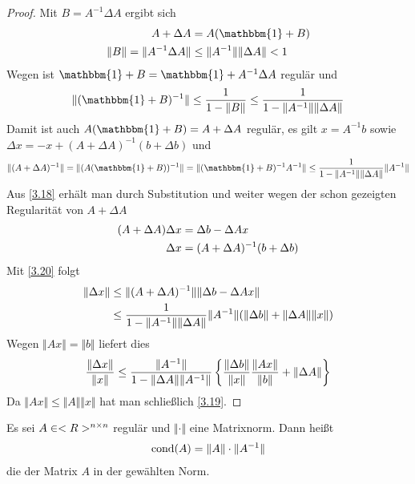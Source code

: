 \begin{proof}
	Mit $B=A^{-1}\Delta A$ ergibt sich
	\begin{align}
		A+\Delta A &= A(\mathbbm{1}+B) \notag \\
		\Vert B\Vert = \Vert A^{-1}\Delta A\Vert &\le \Vert A^{-1}\Vert\Vert \Delta A\Vert < 1\notag
	\end{align}
	Wegen  ist $\mathbbm{1}+B=\mathbbm{1}+A^{-1}\Delta A$ regulär und 
	\begin{align}
		\Vert (\mathbbm{1}+B)^{-1}\Vert \le \frac{1}{1-\Vert B\Vert} \le \frac{1}{1-\Vert A^{-1}\Vert\Vert \Delta A\Vert}\notag
	\end{align}
	Damit ist auch $A(\mathbbm{1}+B)=A+\Delta A$ regulär, es gilt $x=A^{-1}b$ sowie $\Delta x = -x + (A+\Delta A)^{-1}(b+\Delta b)$ und
	\begin{align}
		\label{3.20}
		\Vert (A+\Delta A)^{-1}\Vert = \Vert (A(\mathbbm{1}+B))^{-1}\Vert = \Vert (\mathbbm{1}+B)^{-1}A^{-1}\Vert \le \frac{1}{1-\Vert A^{-1}\Vert\Vert \Delta A\Vert}\Vert A^{-1}\Vert
	\end{align}
	Aus \cref{3.18} erhält man durch Substitution und weiter wegen der schon gezeigten Regularität von $A+\Delta A$
	\begin{align}
		(A+\Delta A)\Delta x &= \Delta b-\Delta Ax \notag \\
		\Delta x &= (A+\Delta A)^{-1}(b+\Delta b)\notag
	\end{align}
	Mit \cref{3.20} folgt
	\begin{align}
		\Vert \Delta x\Vert &\le \Vert (A+\Delta A)^{-1}\Vert\Vert \Delta b-\Delta Ax\Vert\notag \\
		&\le \frac{1}{1-\Vert A^{-1}\Vert\Vert \Delta A\Vert}\Vert A^{-1}\Vert (\Vert \Delta b\Vert + \Vert\Delta A\Vert\Vert x\Vert)\notag
	\end{align}
	Wegen $\Vert Ax\Vert=\Vert b\Vert$ liefert dies
	\begin{align}
		\frac{\Vert\Delta x\Vert}{\Vert x\Vert} \le \frac{\Vert A^{-1}\Vert}{1-\Vert\Delta A\Vert\Vert A^{-1}\Vert}\left\lbrace \frac{\Vert\Delta b\Vert}{\Vert x\Vert}\frac{\Vert Ax\Vert}{\Vert b\Vert} + \Vert\Delta A\Vert\right\rbrace \notag
	\end{align}
	Da $\Vert Ax\Vert\le\Vert A\Vert\Vert x\Vert$ hat man schließlich \cref{3.19}.
\end{proof}

\begin{definition}[Konditionszahl]
	Es sei $A\in<R>^{n\times n}$ regulär und $\Vert\cdot\Vert$ eine Matrixnorm. Dann heißt
	\begin{align}
		\operatorname{cond}(A) = \Vert A\Vert\cdot\Vert A^{-1}\Vert\notag
	\end{align}
	die  der Matrix $A$ in der gewählten Norm.
\end{definition}

